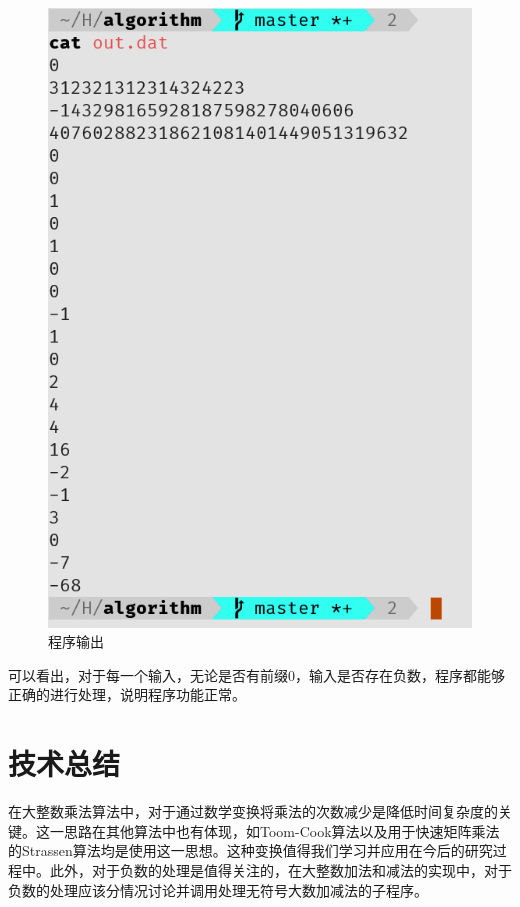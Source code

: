 \documentclass{report}
\begin{document}
\begin{figure}[ht]
\begin{minipage}{.3\textwidth}
        \includegraphics[height=0.3\textheight]{result2_o.png}
        \caption{程序输出}
        \label{fig:result2_o}
    \end{minipage}
\end{figure}
可以看出，对于每一个输入，无论是否有前缀0，输入是否存在负数，程序都能够正确的进行处理，说明程序功能正常。


\section{技术总结}
\label{sec:ji_zhu_zong_jie_2}
在大整数乘法算法中，对于通过数学变换将乘法的次数减少是降低时间复杂度的关键。这一思路在其他算法中也有体现，如Toom-Cook算法以及用于快速矩阵乘法的Strassen算法均是使用这一思想。这种变换值得我们学习并应用在今后的研究过程中。此外，对于负数的处理是值得关注的，在大整数加法和减法的实现中，对于负数的处理应该分情况讨论并调用处理无符号大数加减法的子程序。
\end{document}
